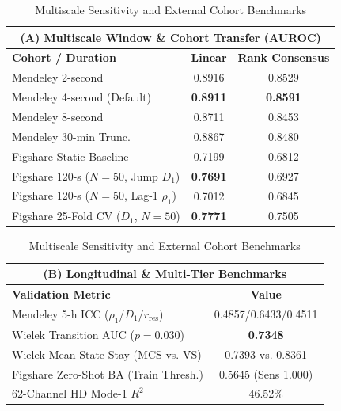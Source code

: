 \begin{table}[t]
\centering
\caption{Multiscale Sensitivity and External Cohort Benchmarks}
\label{tab:multiscale_sensitivity}
\vspace{-4pt}
\small
\renewcommand{\arraystretch}{0.90}
\setlength{\tabcolsep}{2.5pt}
\begin{tabular*}{\columnwidth}{@{\extracolsep{\fill}}lcc}
\hline
\multicolumn{3}{c}{\textbf{(A) Multiscale Window \& Cohort Transfer (AUROC)}} \\
\hline
\textbf{Cohort / Duration} & \textbf{Linear} & \textbf{Rank Consensus} \\
\hline
Mendeley 2-second & 0.8916 & 0.8529 \\
Mendeley 4-second (Default) & \textbf{0.8911} & \textbf{0.8591} \\
Mendeley 8-second & 0.8711 & 0.8453 \\
Mendeley 30-min Trunc. & 0.8867 & 0.8480 \\
Figshare Static Baseline & 0.7199 & 0.6812 \\
Figshare 120-s ($N=50$, Jump $D_1$) & \textbf{0.7691} & 0.6927 \\
Figshare 120-s ($N=50$, Lag-1 $\rho_1$) & 0.7012 & 0.6845 \\
Figshare 25-Fold CV ($D_1$, $N=50$) & \textbf{0.7771} & 0.7505 \\
\hline
\end{tabular*}
\vspace{2pt}
\noindent\begin{tabular*}{\columnwidth}{@{\extracolsep{\fill}}lc}
\hline
\multicolumn{2}{c}{\textbf{(B) Longitudinal \& Multi-Tier Benchmarks}} \\
\hline
\textbf{Validation Metric} & \textbf{Value} \\
\hline
Mendeley 5-h ICC ($\rho_1$/$D_1$/$r_{\text{res}}$) & 0.4857/0.6433/0.4511 \\
Wielek Transition AUC ($p=0.030$) & \textbf{0.7348} \\
Wielek Mean State Stay (MCS vs. VS) & 0.7393 vs. 0.8361 \\
Figshare Zero-Shot BA (Train Thresh.) & 0.5645 (Sens 1.000) \\
62-Channel HD Mode-1 $R^2$ & 46.52\% \\
\hline
\end{tabular*}
\vspace{-4pt}
\end{table}
